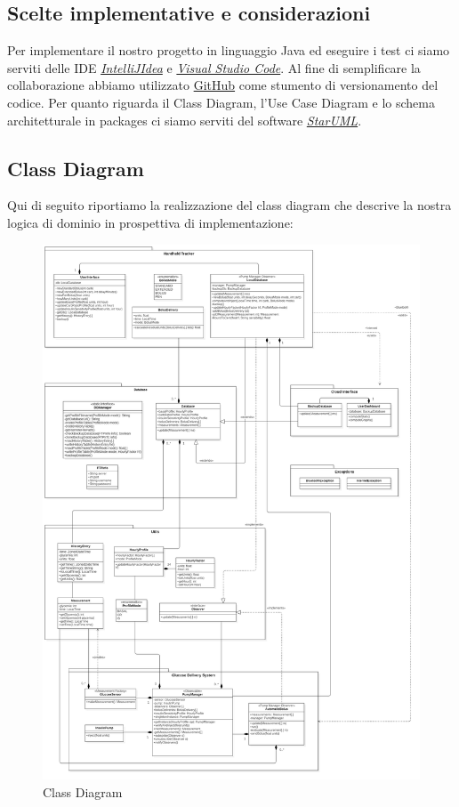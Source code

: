 \documentclass[twocolumn]{article}
\begin{document}
\subsection{Scelte implementative e considerazioni}
Per implementare il nostro progetto in linguaggio Java ed eseguire i test ci siamo serviti delle IDE \href{https://www.jetbrains.com/idea/}{\textit{IntelliJIdea}} e \href{https://code.visualstudio.com/}{\textit{Visual Studio Code}}. Al fine di semplificare la collaborazione abbiamo utilizzato \href{https://github.com/federicomarra/swe-diab}{GitHub} come stumento di versionamento del codice. Per quanto riguarda il Class Diagram, l’Use Case Diagram e lo schema architetturale in packages ci siamo serviti del software \href{https://staruml.io/}{\textit{StarUML}}.

\subsection{Class Diagram}

Qui di seguito riportiamo la realizzazione del class diagram che descrive la nostra logica di dominio in prospettiva di implementazione:
\clearpage
\begin{figure}[H]
    \centering
    \includegraphics[width=16cm]{ClassDiagram.jpg}
    \caption{Class Diagram}
    \label{fig:class-diagram}
\end{figure}
\clearpage
\end{document}
